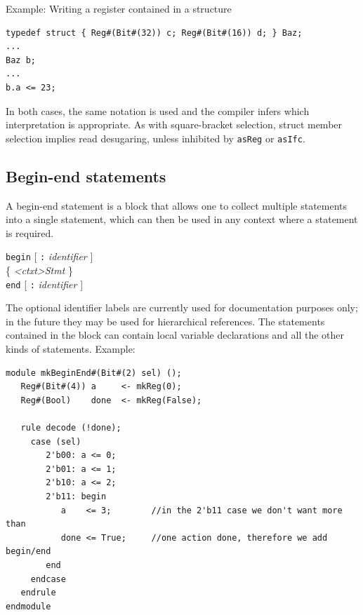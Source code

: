 \documentclass[twoside,letterpaper]{article}
\newcommand{\hm}{\hspace*{1em}}
\newcommand{\hmm}{\hspace*{2em}}
\newcommand{\nterm}[1]{\emph{#1}}
\newcommand{\term}[1]{\texttt{#1}}
\newcommand{\many}[1]{\{ #1 \}}
\newcommand{\opt}[1]{[ #1 ]}
\newcommand{\gram}[2]{    \hm\makebox[10em][l]{\it #1}\makebox[1.5em][l]{::=}    #2}
\newcommand{\grammore}[1]{\hm\makebox[10em][l]{      }\makebox[1.5em][l]{}       #1}
\begin{document}
Example: Writing a register contained in a structure
\begin{verbatim}
typedef struct { Reg#(Bit#(32)) c; Reg#(Bit#(16)) d; } Baz;
...
Baz b;
...
b.a <= 23;
\end{verbatim} 
In both cases, the same notation is used and the compiler infers which 
interpretation is appropriate. As with square-bracket selection, struct 
member selection implies read desugaring, unless inhibited by 
{\tt asReg} or {\tt asIfc}.


 

\subsection{Begin-end statements}

\label{sec-begin-end-stmts}

A begin-end statement is a block that allows one to collect multiple
statements into a single statement, which can then be used in any
context where a statement is required.

\gram{<ctxt>BeginEndStmt}{ \term{begin} \opt{ \term{:} \nterm{identifier} } } \\
\grammore                { \hmm \many{ \nterm{<ctxt>Stmt} } }                 \\
\grammore                { \term{end} \opt{ \term{:} \nterm{identifier} } }

The optional identifier labels are currently used for documentation
purposes only; in the future they may be used for hierarchical
references.  The statements contained in the block can contain local
variable declarations and all the other kinds of statements.  Example:
\begin{verbatim}
module mkBeginEnd#(Bit#(2) sel) ();
   Reg#(Bit#(4)) a     <- mkReg(0);
   Reg#(Bool)    done  <- mkReg(False);
   
   rule decode (!done);
     case (sel)
        2'b00: a <= 0;
        2'b01: a <= 1;
        2'b10: a <= 2;
        2'b11: begin
           a    <= 3;        //in the 2'b11 case we don't want more than
           done <= True;     //one action done, therefore we add begin/end
        end
     endcase
   endrule
endmodule
\end{verbatim}
\end{document}
